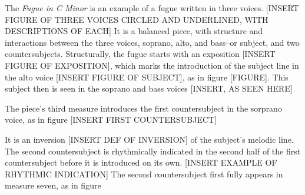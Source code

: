 The \textit{Fugue in C Minor} is an example of a fugue written in three voices. [INSERT FIGURE OF THREE VOICES CIRCLED AND UNDERLINED, WITH DESCRIPTIONS OF EACH] It is a balanced piece, with structure and interactions between the three voices, soprano, alto, and bass--or subject, and two countersubjects. Structurally, the fugue starts with an exposition [INSERT FIGURE OF EXPOSITION], which marks the introduction of the subject line in the alto voice [INSERT FIGURE OF SUBJECT], as in figure [FIGURE]. This subject then is seen in the soprano and bass voices [INSERT, AS SEEN HERE]
%

The piece's third measure introduces the first countersubject in the sorprano voice, as in figure [INSERT FIRST COUNTERSUBJECT]


It is an inversion [INSERT DEF OF INVERSION] of the subject's melodic line. The second countersubject is rhythmically indicated in the second half of the first countersubject before it is introduced on its own. [INSERT EXAMPLE OF RHYTHMIC INDICATION] The second countersubject first fully appears in measure seven, as in figure 

%
%
%


